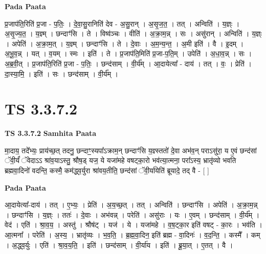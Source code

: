 \documentclass[17pt]{extarticle}
\begin{document}
\textbf{Pada Paata} \newline

प्र॒जाप॑ति॒रिति॑ प्र॒जा - प॒तिः॒ । दे॒वा॒सु॒रानिति॑ देव - अ॒सु॒रान् । अ॒सृ॒ज॒त॒ । तत् । अन्विति॑ । य॒ज्ञ्ः । अ॒सृ॒ज्य॒त॒ । य॒ज्ञ्म् । छन्दाꣳ॑सि । ते । विष्व॑ञ्चः । वीति॑ । अ॒क्रा॒म॒न्न् । सः । असु॑रान् । अन्विति॑ । य॒ज्ञ्ः । अपेति॑ । अ॒क्रा॒म॒त् । य॒ज्ञ्म् । छन्दाꣳ॑सि । ते । दे॒वाः । अ॒म॒न्य॒न्त॒ । अ॒मी इति॑ । वै । इ॒दम् । अ॒भू॒व॒न्न् । यत् । व॒यम् । स्मः । इति॑ । ते । प्र॒जाप॑ति॒मिति॑ प्र॒जा-प॒ति॒म् । उपेति॑ । अ॒धा॒व॒न्न् । सः । अ॒ब्र॒वी॒त् । प्र॒जाप॑ति॒रिति॑ प्र॒जा - प॒तिः॒ । छन्द॑साम् । वी॒र्य᳚म् । आ॒दायेत्या᳚ - दाय॑ । तत् । वः॒ । प्रेति॑ । दा॒स्या॒मि॒ । इति॑ । सः । छन्द॑साम् । वी॒र्य᳚म् ।  \newline





\section{ TS 3.3.7.2 }

\textbf{TS 3.3.7.2 } \newline
\textbf{Samhita Paata} \newline

मा॒दाय॒ तदे᳚भ्यः॒ प्राय॑च्छ॒त् तदनु॒ छन्दाꣳ॒॒स्यपा᳚ऽक्राम॒न् छन्दाꣳ॑सि य॒ज्ञ्स्ततो॑ दे॒वा अभ॑व॒न् पराऽसु॑रा॒ य ए॒वं छन्द॑सां ॅवी॒र्यं॑ ॅवेदाऽऽ श्रा॑व॒याऽस्तु॒ श्रौष॒ड् यज॒ ये यजा॑महे वषट्का॒रो भव॑त्या॒त्मना॒ परा᳚ऽस्य॒ भ्रातृ॑व्यो भवति ब्रह्मवा॒दिनो॑ वदन्ति॒ कस्मै॒ कम॑द्ध्व॒र्युरा श्रा॑वय॒तीति॒ छन्द॑सां ॅवी॒र्या॑येति॑ ब्रूयादे॒ तद् वै - [  ] \newline

\textbf{Pada Paata} \newline

आ॒दायेत्या᳚-दाय॑ । तत् । ए॒भ्यः॒ । प्रेति॑ । अ॒य॒च्छ॒त् । तत् । अन्विति॑ । छन्दाꣳ॑सि । अपेति॑ । अ॒क्रा॒म॒न्न् । छन्दाꣳ॑सि । य॒ज्ञ्ः । ततः॑ । दे॒वाः । अभ॑वन्न् । परेति॑ । असु॑राः । यः । ए॒वम् । छन्द॑साम् । वी॒र्य᳚म् । वेद॑ । एति॑ । श्रा॒व॒य॒ । अस्तु॑ । श्रौष॑ट् । यज॑ । ये । यजा॑महे । व॒ष॒ट्का॒र इति॑ वषट् - का॒रः । भव॑ति । आ॒त्मना᳚ । परेति॑ । अ॒स्य॒ । भ्रातृ॑व्यः । भ॒व॒ति॒ । ब्र॒ह्म॒वा॒दिन॒ इति॑ ब्रह्म - वा॒दिनः॑ । व॒द॒न्ति॒ । कस्मै᳚ । कम् । अ॒द्ध्व॒र्युः । एति॑ । श्रा॒व॒य॒ति॒ । इति॑ । छन्द॑साम् । वी॒र्या॑य । इति॑ । ब्रू॒या॒त् । ए॒तत् । वै ।  \newline




\end{document}
